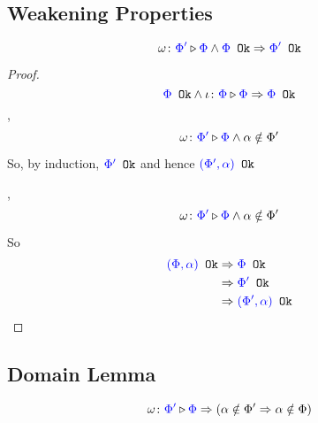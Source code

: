 \documentclass{report}
\begin{document}
        \subsection{Weakening Properties}
        \begin{property}

        \begin{equation}
            \omega \colon {\color{blue}\Phi'} \triangleright {\color {blue} \Phi} \wedge {\color{blue} \Phi} \texttt{ Ok}\Rightarrow {\color{blue} \Phi'} \texttt{ Ok}
        \end{equation}
        \end{property}
        \begin{framed}
            \begin{proof}
    
            \subcase{$\i$}
            $${\color{blue} \Phi} \texttt{ Ok} \wedge\iota \colon {\color{blue}\Phi} \triangleright {\color {blue} \Phi} \Rightarrow {\color{blue} \Phi} \texttt{ Ok}$$ 
            \subcase{$\w\pi$}
            \bi,
            \begin{equation}
                \omega \colon {\color{blue}\Phi'} \triangleright {\color {blue} \Phi} \wedge \alpha\notin\Phi'
            \end{equation}
    
            So, by induction, ${\color{blue} \Phi'} \texttt{ Ok}$ and hence ${\color{blue} (\Phi', \alpha)} \texttt{ Ok}$
    
            \subcase{$\w\x$}
            \bi, 
            \begin{equation}
                \omega \colon {\color{blue}\Phi'} \triangleright {\color {blue} \Phi} \wedge \alpha\notin\Phi'
            \end{equation}
    
            So
            \begin{align*}
                {\color{blue} (\Phi, \alpha)} \texttt{ Ok} & \Rightarrow {\color{blue} \Phi} \texttt{ Ok} \\
                & \Rightarrow {\color{blue} \Phi'} \texttt{ Ok}\\
                & \Rightarrow {\color{blue} (\Phi', \alpha)} \texttt{ Ok}\\
            \end{align*}
    
            \end{proof}
        \end{framed}

        \begin{property}

        \subsection{Domain Lemma}
        $$\omega \colon {\color{blue}\Phi'} \triangleright {\color {blue} \Phi} \Rightarrow (\alpha\notin\Phi' \Rightarrow \alpha\notin\Phi)$$
        \end{property}
\end{document}
